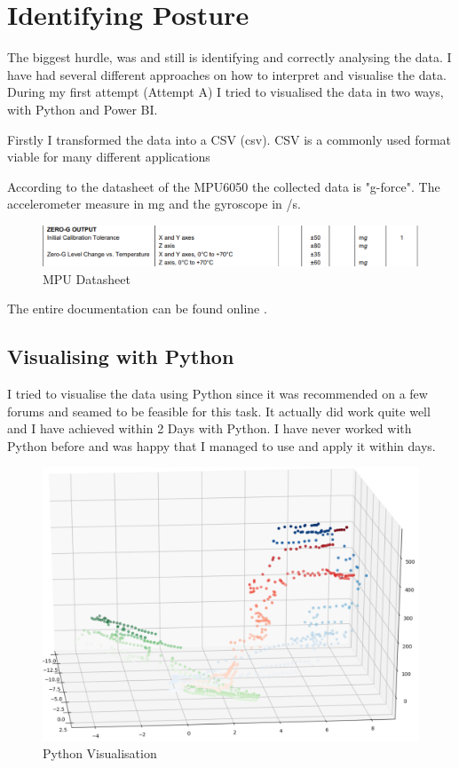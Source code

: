\section{Identifying Posture}

The biggest hurdle, was and still is identifying and correctly analysing the data. I have had several different approaches on how to interpret and visualise the data. During my first attempt (Attempt A) I tried to visualised the data in two ways, with Python and Power BI.

Firstly I transformed the data into a \gls{CSV} (\acrshort{csv}). CSV is a commonly used format viable for many different applications

According to the datasheet of the MPU6050 the collected data is "g-force". The accelerometer measure in mg and the gyroscope in \degree/s. 

\begin{figure}[h]
\begin{center}
\includegraphics[width=\linewidth]{images/MPU6050_DATA.png}
  \end{center}
  \caption{MPU Datasheet}
  \label{fig:MPUDatasheet}
\end{figure}

The entire documentation can be found online \cite{MPU6000D59:online}.

\subsection{Visualising with Python}

I tried to visualise the data using \gls{Python} since it was recommended on a few forums and seamed to be feasible for this task. It actually did work quite well and I have achieved within 2 Days with Python. I have never worked with Python before and was happy that I managed to use and apply it within days. 

\begin{figure}[h!]
\begin{center}
\includegraphics[width=0.6\linewidth]{images/PyVisualisation.png}
  \end{center}
  \caption{Python Visualisation}
  \label{fig:PythonVisualisation}
\end{figure}

